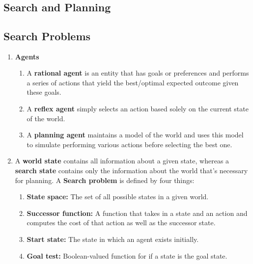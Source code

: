 \documentclass[10pt]{article}
\begin{document}
\date{}
\title{\vspace{-5ex}  \vspace{-5ex}}
\maketitle
\begin{multicols}{2}
\section{Search and Planning}
\begin{enumerate}
    \subsection{Search Problems} 
    \begin{enumerate}
         \item \textbf{Agents}
         \begin{enumerate}
             \item A \textbf{rational agent} is an entity that has goals or preferences and performs a series of actions that yield the best/optimal expected outcome given these goals.
             \item A \textbf{reflex agent} simply selects an action based solely on the current state of the world.
             \item A \textbf{planning agent} maintains a model of the world and uses this model to simulate performing various actions before selecting the best one.
         \end{enumerate} 
         
         \item A \textbf{world state} contains all information about a given state, whereas a \textbf{search state} contains only the information about the world that’s necessary for planning. A \textbf{Search problem} is defined by four things:
         \begin{enumerate}
             \item \textbf{State space:} The set of all possible states in a given world.
             \item \textbf{Successor function:} A function that takes in a state and an action and computes the cost of that action as well as the successor state.
             \item \textbf{Start state:} The state in which an agent exists initially.
             \item \textbf{Goal test:} Boolean-valued function for if a state is the goal state.
         \end{enumerate}
         

\end{enumerate}
\end{enumerate}
\end{multicols}
\end{document}
